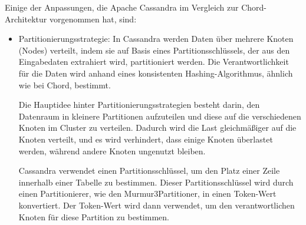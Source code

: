 Einige der Anpassungen, die Apache Cassandra im Vergleich zur Chord-Architektur vorgenommen hat, sind:
\begin{itemize} 
\item Partitionierungsstrategie: In Cassandra werden Daten über mehrere Knoten (Nodes) verteilt, indem sie auf Basis eines Partitionsschlüssels, der aus den Eingabedaten extrahiert wird, partitioniert werden. Die Verantwortlichkeit für die Daten wird anhand eines konsistenten Hashing-Algorithmus, ähnlich wie bei Chord, bestimmt.

Die Hauptidee hinter Partitionierungsstrategien besteht darin, den Datenraum in kleinere Partitionen aufzuteilen und diese auf die verschiedenen Knoten im Cluster zu verteilen. Dadurch wird die Last gleichmäßiger auf die Knoten verteilt, und es wird verhindert, dass einige Knoten überlastet werden, während andere Knoten ungenutzt bleiben.

Cassandra verwendet einen Partitionsschlüssel, um den Platz einer Zeile innerhalb einer Tabelle zu bestimmen. Dieser Partitionsschlüssel wird durch einen Partitionierer, wie den Murmur3Partitioner, in einen Token-Wert konvertiert. Der Token-Wert wird dann verwendet, um den verantwortlichen Knoten für diese Partition zu bestimmen.


\end{itemize}
